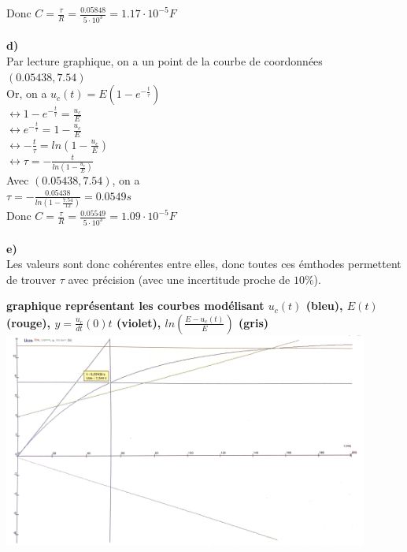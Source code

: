 \documentclass{article}
\begin{document}
Donc $C = \frac{\tau}{R} = \frac{0.05848}{5 \cdot 10^3} = 1.17 \cdot 10^{-5} F$ \\ \\
\large{\textbf{d)}} \\
Par lecture graphique, on a un point de la courbe de coordonnées $(0.05438, 7.54)$ \\

Or, on a $u_c(t) = E(1 - e^{-\frac{t}{\tau}})$ \\

$\leftrightarrow 1 - e^{-\frac{t}{\tau}} = \frac{u_c}{E}$ \\
$\leftrightarrow e^{-\frac{t}{\tau}} = 1 - \frac{u_c}{E}$ \\
$\leftrightarrow -\frac{t}{\tau} = ln({1 - \frac{u_c}{E}})$ \\
$\leftrightarrow \tau = -\frac{t}{ln({1 - \frac{u_c}{E}})}$ \\

Avec $(0.05438, 7.54)$, on a \\

$\tau = -\frac{0.05438}{ln({1 - \frac{7.54}{12}})} = 0.0549 s$ \\

Donc $C = \frac{\tau}{R} = \frac{0.05549}{5 \cdot 10^3} = 1.09 \cdot 10^{-5} F$ \\ \\
\large{\textbf{e)}} \\
Les valeurs sont donc cohérentes entre elles, donc toutes ces émthodes permettent de trouver $\tau$ avec précision (avec une incertitude proche de $10\%$).
\begin{center}
    \large{\textbf{graphique représentant les courbes modélisant $u_c(t)$ (bleu), $E(t)$ (rouge), $y = \frac{u_c}{dt}(0) t$ (violet), $ln({\frac{E - u_c(t)}{E}})$ (gris)}} \\
    \includegraphics[width = 12cm]{graph.png}
\end{center}
\end{document}
